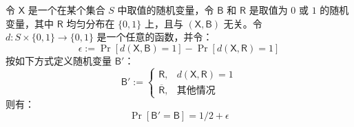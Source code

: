 \begin{lemma}\label{lemma:3-5}
令 $\boldsymbol{\mathsf{X}}$ 是一个在某个集合 $S$ 中取值的随机变量，令 $\boldsymbol{\mathsf{B}}$ 和 $\boldsymbol{\mathsf{R}}$ 是取值为 $0$ 或 $1$ 的随机变量，其中 $\boldsymbol{\mathsf{R}}$ 均匀分布在 $\{0,1\}$ 上，且与 $(\boldsymbol{\mathsf{X}},\boldsymbol{\mathsf{B}})$ 无关。令 $d:S\times\{0,1\}\to\{0,1\}$ 是一个任意的函数，并令：
\[
\epsilon
:=
\Pr[d(\boldsymbol{\mathsf{X}},\boldsymbol{\mathsf{B}})=1]
-
\Pr[d(\boldsymbol{\mathsf{X}},\boldsymbol{\mathsf{R}})=1]
\]
按如下方式定义随机变量 $\boldsymbol{\mathsf{B}}'$：
\[
\boldsymbol{\mathsf{B}}':=
\left\{
\begin{array}{ll}
\boldsymbol{\mathsf{R}}, & d(\boldsymbol{\mathsf{X}},\boldsymbol{\mathsf{R}})=1\\
\boldsymbol{\mathsf{\overline R}}, & \text{其他情况}
\end{array}
\right.
\]
则有：
\[
\Pr[\boldsymbol{\mathsf{B}}'=\boldsymbol{\mathsf{B}}]={1}/{2}+\epsilon
\]
\end{lemma}

